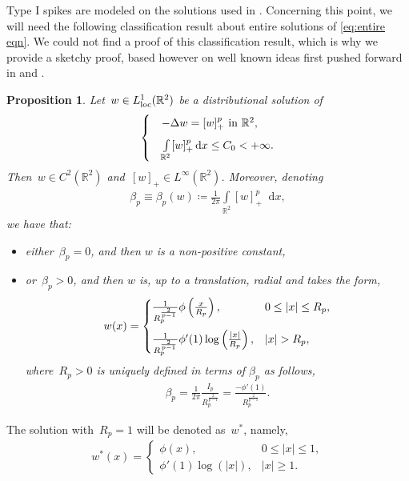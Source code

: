\documentclass[10pt]{amsart}
\newcommand{\parenthesis}[1]{\left(#1\right)} %
\newcommand{\R}{\mathbb{R}}
\newcommand{\dd}{\mathop{}\!\mathrm{d}}
\def\R{\mathbb{R}}
\newtheorem{proposition}[theorem]{Proposition}
\begin{document}
    Type I spikes are modeled on the solutions used in \cite{DY}. Concerning this point, we will need the following classification
    result about entire solutions of \eqref{eq:entire eqn}. We could not find a proof of this classification result, which is why we
    provide a sketchy proof, based however on well known ideas first pushed forward in \cite{bm} and \cite{cli2}.
    \begin{proposition}\label{prop:entire solution}
        Let~$w\in L^1_{\rm loc}(\R^2)$ be a distributional solution of
        \begin{align}\label{eq:entire eqn}
            \begin{cases}
               & -\Delta w = [w]_+^p  \mbox{ in } \R^2, \vspace{2mm} \\
            &\int\limits_{\R^2} [w]_+^p \dd{x} \leq C_0<+\infty.
            \end{cases}
        \end{align}
        Then~$w\in C^2(\R^2)$ and~$[w]_+\in L^\infty(\R^2)$.
        Moreover, denoting
        \begin{align*}
            \beta_p\equiv \beta_p(w)\coloneqq \frac{1}{2\pi}\int\limits_{\R^2} [w]_+^p\dd{x},
        \end{align*}
        we have that:
        \begin{itemize}
            \item either~$\beta_p=0$, and then $w$ is a non-positive constant,
            \item or~$\beta_p>0$, and then $w$ is, up to a translation, radial and takes the form,
                    \begin{align}\label{eq:entire solution}
                        w(x)=
                        \begin{cases}
                            \frac{1}{R_p^{\frac{2}{p-1}}}\phi\parenthesis{\frac{x}{R_p}}, & 0\leq |x|\leq R_p, \vspace{2mm} \\
                            \frac{1}{R_p^{\frac{2}{p-1}}}\phi'(1)\log\parenthesis{\frac{|x|}{R_p}}, & |x|>R_p,
                        \end{cases}
                    \end{align}
                    where~$R_p>0$ is uniquely defined in terms of $\beta_p$ as follows,
                    \begin{align}\label{Wpdef}
                        \beta_p
                        =\frac{1}{2\pi} \frac{I_p}{R_p^{\frac{2}{p-1}}}=\frac{-\phi'(1)}{R_p^{\frac{2}{p-1}}}.
                    \end{align}
        \end{itemize}
    \end{proposition}
The solution with~$R_p=1$ will be denoted as~$w^*$, namely,
    \begin{align}
        w^*(x)=\begin{cases}\label{wstar}
            \phi(x), & 0\leq |x|\leq 1, \\
            \phi'(1)\log(|x|), & |x|\geq 1.
        \end{cases}
    \end{align}
\end{document}
